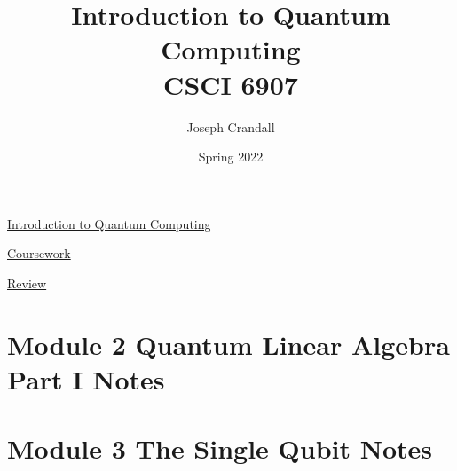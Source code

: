 
\usepackage{algorithm, algpseudocode, color, gensymb, siunitx, soul, subfiles, verbatim}
\usepackage[a4paper, total={7.5in, 10in}]{geometry}

\title{Introduction to Quantum Computing\\
\large CSCI 6907}
\author{Joseph Crandall}
\date{Spring 2022}


\maketitle

\href{https://www2.seas.gwu.edu/~simhaweb/quantum/index.html}{Introduction to Quantum Computing}

\href{https://www2.seas.gwu.edu/~simhaweb/quantum/coursework.html}{Coursework}


\href{https://www2.seas.gwu.edu/~simhaweb/quantum/modules/review/review.html}{Review}

\begin{comment}

\section{Linear Algebra Review}


\section{Math Review}


\section{Computing Review}


\end{comment}

\section{Module 2 Quantum Linear Algebra Part I Notes}


\section{Module 3 The Single Qubit Notes}


